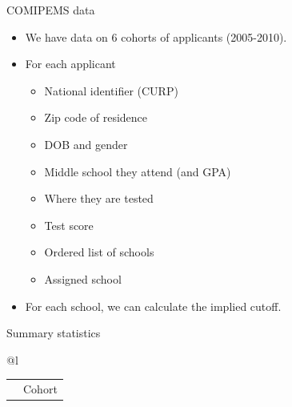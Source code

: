 \documentclass[notes,11pt, aspectratio=169]{beamer}
\begin{document}
\begin{frame}{COMIPEMS data}
  \begin{itemize}
    \vfill\item We have data on 6 cohorts of applicants (2005-2010).
    \vfill\item For each applicant
      \begin{itemize}
      \vfill\item National identifier (CURP)
      \vfill\item Zip code of residence
      \vfill\item DOB and gender
      \vfill\item Middle school they attend (and GPA)
      \vfill\item Where they are tested
      \vfill\item Test score
      \vfill\item Ordered list of schools
      \vfill\item Assigned school
      \end{itemize}
          \vfill\item For each school, we can calculate the implied  cutoff.
  \end{itemize}
    
\end{frame}

\begin{frame}{Summary statistics}
\begin{table}[H]
\centering
\begin{adjustbox}{totalheight=0.9\textheight}
\begin{threeparttable}
\centering
\begin{tabular}[t]{@{}l}
\toprule
\begin{tabular}[t]{lcccccc}
&	\multicolumn{6}{c}{Cohort} \\
 \cmidrule(lr){2-7}

\end{tabular}
\tabularnewline \bottomrule
\end{tabular}
\end{threeparttable}
\end{adjustbox}
\end{table}
\end{frame}
\end{document}
